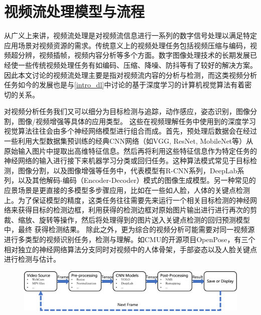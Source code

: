 \section{视频流处理模型与流程}\label{intro_vp}
从广义上来讲，视频流处理是对视频流信息进行一系列的数字信号处理以满足特定应用场景对视频资源的需求。传统意义上的视频处理任务包括视频压缩与编码，视频超分辨，视频插帧，视频内容分析等多个方面。数字图像处理技术的长期发展已经使一些传统视频处理任务有如编码、压缩、降噪、防抖等有了较好的解决方案。因此本文讨论的视频流处理主要是指对视频流内容的分析与检测，而这类视频分析任务如今的发展也是与\ref{intro_dl}中讨论的基于深度学习的计算机视觉算法有着密切的关系。\par
对视频分析任务我们又可以细分为目标检测与追踪，动作感应，姿态识别，图像分割，图像/视频增强等具体的应用类型。%
这些在视频理解任务中使用到的深度学习视觉算法往往会由多个神经网络模型进行组合而成。首先，预处理后数据会在经过一些利用大型数据集预训练的经典CNN网络（如VGG\cite{simonyan2014very}, ResNet\cite{he2016deep}, MobileNet\cite{howard2017mobilenets}等）从原始输入图片中提取出高维特征信息。然后再将利用这些特征信息作为特定任务的神经网络的输入进行接下来机器学习分类或回归任务。这种算法模式常见于目标检测，图像分割，以及图像增强等任务中，代表模型有R-CNN\cite{he2017mask}系列，DeepLab\cite{chen2017deeplab}系列，以及其他解码-编码（Encoder-Decoder）模式的图像生成模型。另一种常见的应景场景是更直接的多模型多步骤应用，比如在一些如人脸，人体的关键点检测上。为了保证模型的精度，这类任务往往需要先来运行一个相关目标检测的神经网络来获得目标的检测边框，利用获得的检测边框对原始图片输出进行进行再次的剪裁、缩放、旋转等操作，然后将处理得到的图片送入关键点检测的回归预测模型中，最终
获得检测结果\cite{fang2017rmpe,zhang2016joint}。%
除此之外，更为综合的视频分析可能需要对同一视频源进行多类型的视频识别任务，检测与理解。如CMU的开源项目OpenPose\cite{cao2018openpose}，有三个相对独立的神经网络算法分支同时对视频中的人体骨架，手部姿态以及人脸关键点进行检测与估计。\par
\begin{figure}[!htp]
    \centering
    \includegraphics[width=\textwidth]{figure/video_proc_flow.pdf}
    \label{fig:video_proc_flow}
\end{figure}
